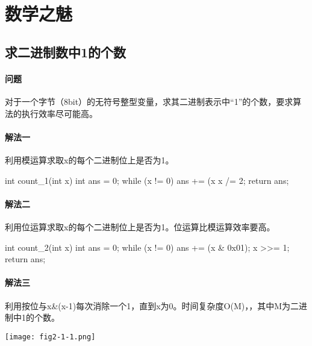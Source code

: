 \chapter{数学之魅}

\section{求二进制数中1的个数} %
\label{sec:number-of-1s-in-binary}


\subsubsection{问题}
对于一个字节（8bit）的无符号整型变量，求其二进制表示中“1”的个数，要求算法的执行效率尽可能高。

\subsubsection{解法一}
利用模运算求取x的每个二进制位上是否为1。
\begin{Codex}[label={[$O(lg(x))+O(1)$]Chap02_01_NumberOfOnes.java}]
	int count_1(int x) {
		int ans = 0;
		while (x != 0) {
			ans += (x %
			x /= 2;
		}
		return ans;
	}
\end{Codex}

\subsubsection{解法二}
利用位运算求取x的每个二进制位上是否为1。位运算比模运算效率要高。
\begin{Codex}[label={[$O(lg(x))+O(1)$]Chap02_01_NumberOfOnes.java}]
	int count_2(int x) {
		int ans = 0;
		while (x != 0) {
			ans += (x & 0x01);
			x >>= 1;
		}
		return ans;
	}
\end{Codex}

\subsubsection{解法三}
利用按位与x\&(x-1)每次消除一个1，直到x为0。时间复杂度O(M)，，其中M为二进制中1的个数。
\begin{center}
	\texttt{[image: fig2-1-1.png]}\\
	\label{fig:number-of-ones-1}
\end{center}


